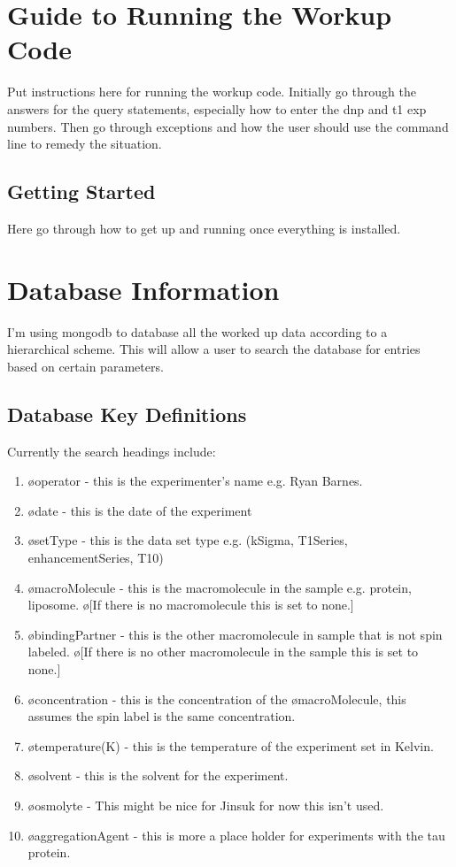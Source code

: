 \documentclass[10pt]{book}
\begin{document}
\chapter{Guide to Running the Workup Code}
Put instructions here for running the workup code. Initially go through the answers for the query statements, especially how to enter the dnp and t1 exp numbers. Then go through exceptions and how the user should use the command line to remedy the situation.

\section{Getting Started}
Here go through how to get up and running once everything is installed.

\chapter{Database Information}
I'm using mongodb to database all the worked up data according to a hierarchical scheme. This will allow a user to search the database for entries based on certain parameters. 

\section{Database Key Definitions}
Currently the search headings include:
\begin{enumerate}
    \item \o{operator} - this is the experimenter's name e.g. Ryan Barnes.
    \item \o{date} - this is the date of the experiment
    \item \o{setType} - this is the data set type e.g. (kSigma, T1Series, enhancementSeries, T10)
    \item \o{macroMolecule} - this is the macromolecule in the sample e.g. protein, liposome. \o[If there is no macromolecule this is set to none.]{} 
    \item \o{bindingPartner} - this is the other macromolecule in sample that is not spin labeled. \o[If there is no other macromolecule in the sample this is set to none.]{} 
    \item \o{concentration} - this is the concentration of the \o{macroMolecule}, this assumes the spin label is the same concentration.
    \item \o{temperature(K)} - this is the temperature of the experiment set in Kelvin.
    \item \o{solvent} - this is the solvent for the experiment.
    \item \o{osmolyte} - This might be nice for Jinsuk for now this isn't used.
    \item \o{aggregationAgent} - this is more a place holder for experiments with the tau protein.
\end{enumerate}
\end{document}
